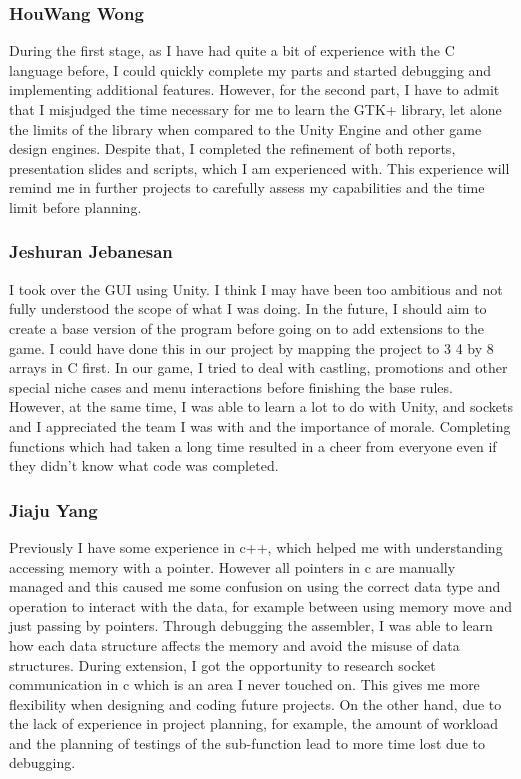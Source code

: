 \documentclass[10pt]{article}
\begin{document}
\subsubsection{HouWang Wong}
During the first stage, as I have had quite a bit of experience with the C language before, I could quickly complete my parts and started debugging and implementing additional features. However, for the second part, I have to admit that I misjudged the time necessary for me to learn the GTK+ library, let alone the limits of the library when compared to the Unity Engine and other game design engines. Despite that, I completed the refinement of both reports, presentation slides and scripts, which I am experienced with. This experience will remind me in further projects to carefully assess my capabilities and the time limit before planning.
\subsubsection{Jeshuran Jebanesan}
I took over the GUI using Unity. I think I may have been too ambitious and not fully understood the scope of what I was doing. In the future, I should aim to create a base version of the program before going on to add extensions to the game. I could have done this in our project by mapping the project to 3 4 by 8 arrays in C first. In our game, I tried to deal with castling, promotions and other special niche cases and menu interactions before finishing the base rules. However, at the same time, I was able to learn a lot to do with Unity, and sockets and I appreciated the team I was with and the importance of morale. Completing functions which had taken a long time resulted in a cheer from everyone even if they didn't know what code was completed.
\subsubsection{Jiaju Yang}
Previously I have some experience in c++, which helped me with understanding accessing memory with a pointer. However all pointers in c are manually managed and this caused me some confusion on using the correct data type and operation to interact with the data, for example between using memory move and just passing by pointers. Through debugging the assembler, I was able to learn how each data structure affects the memory and avoid the misuse of data structures. During extension, I got the opportunity to research socket communication in c which is an area I never touched on. This gives me more flexibility when designing and coding future projects. On the other hand, due to the lack of experience in project planning, for example, the amount of workload and the planning of testings of the sub-function lead to more time lost due to debugging.
\end{document}
